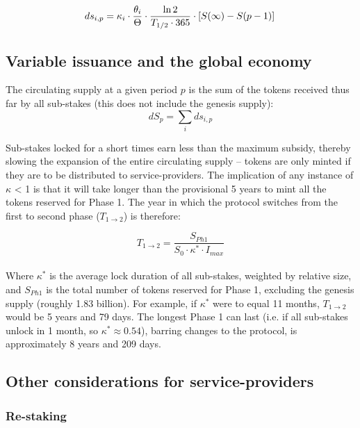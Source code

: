 \documentclass[longbibliography,nofootinbib]{revtex4-1}
\begin{document}
\begin{equation}
    \label{eq:rate-max}
    ds_{i,p} = \kappa_i \cdot \frac{\theta_i}{\Theta} \cdot \frac{\ln{2}}{T_{1/2} \cdot 365 } \cdot \left[S(\infty) - S(p-1) \right]\\
\end{equation}

\subsection{Variable issuance and the global economy}

The circulating supply at a given period $p$ is the sum of the tokens received thus far by all sub-stakes (this does not include the genesis supply):
\begin{equation}
    dS_p= \sum_i ds_{i,p}
\end{equation}

Sub-stakes locked for a short times earn less than the maximum subsidy, thereby slowing the expansion of the entire circulating supply – tokens are only minted if they are to be distributed to service-providers. The implication of any instance of $\kappa$ < 1 is that it will take longer than the provisional 5 years to mint all the tokens reserved for Phase 1. The year in which the protocol switches from the first to second phase ($T_{1\rightarrow2}$) is therefore: 

\begin{equation}
\label{phaseswitch}
    T_{1\rightarrow2}= \frac{S_{Ph1}}{S_0 \cdot \kappa^* \cdot I_{max}}
\end{equation}
\\
Where $\kappa^*$ is the average lock duration of all sub-stakes, weighted by relative size, and $S_{Ph1}$ is the total number of tokens reserved for Phase 1, excluding the genesis supply (roughly 1.83 billion). For example, if $\kappa^*$ were to equal 11 months, $T_{1\rightarrow2}$ would be  5 years and 79 days. The longest Phase 1 can last (i.e. if all sub-stakes unlock in 1 month, so $\kappa^* \approx 0.54$), barring changes to the protocol, is approximately 8 years and 209 days.

\subsection{Other considerations for service-providers}

\subsubsection{Re-staking}
\end{document}
